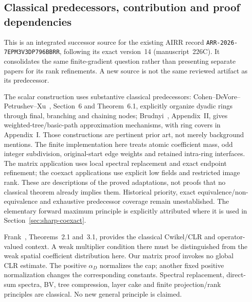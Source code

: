 \documentclass[11pt]{article}
\begin{document}


\subsection{Classical predecessors, contribution and proof dependencies}
This is an integrated successor source for the existing AIRR record
\texttt{ARR-2026-7EPM3V3DP796BBRR}, following its exact version~14
(manuscript~226C). It consolidates the same finite-gradient question rather
than presenting separate papers for its rank refinements. A new source is
not the same reviewed artifact as its predecessor.

The scalar construction uses substantive classical predecessors:
Cohen--DeVore--Petrushev--Xu~\cite{cdpx223}, Section~6 and Theorem~6.1,
explicitly organize dyadic rings through final, branching and chaining nodes;
Brudnyi~\cite{brudnyi221}, Appendix~II, gives weighted-tree/basic-path
approximation mechanisms, with ring covers in Appendix~I.
Those constructions are pertinent prior art, not merely background mentions.
The finite implementation here treats atomic coefficient mass, odd integer
subdivision, original-start edge weights and retained intra-ring interfaces.
The matrix application uses local spectral replacement and exact endpoint
refinement; the coexact applications use explicit low fields and restricted
image rank. These are descriptions of the proved adaptations, not proofs
that no classical theorem already implies them. Historical priority,
exact equivalence/non-equivalence and exhaustive predecessor coverage remain
unestablished. The elementary forward maximum principle is explicitly
attributed where it is used in Section~\ref{sec:sharp-coexact}.

Frank~\cite{frank}, Theorems~2.1 and~3.1, provides the classical
Cwikel/CLR and operator-valued context. A weak multiplier condition there
must be distinguished from the weak spatial coefficient distribution here.
Our matrix proof invokes no global CLR estimate. The positive $\alpha_D$
normalizes the cap; another fixed positive normalization changes the
corresponding constants. Spectral replacement, direct-sum spectra, BV,
tree compression, layer cake and finite projection/rank principles are
classical. No new general principle is claimed.
\end{document}
